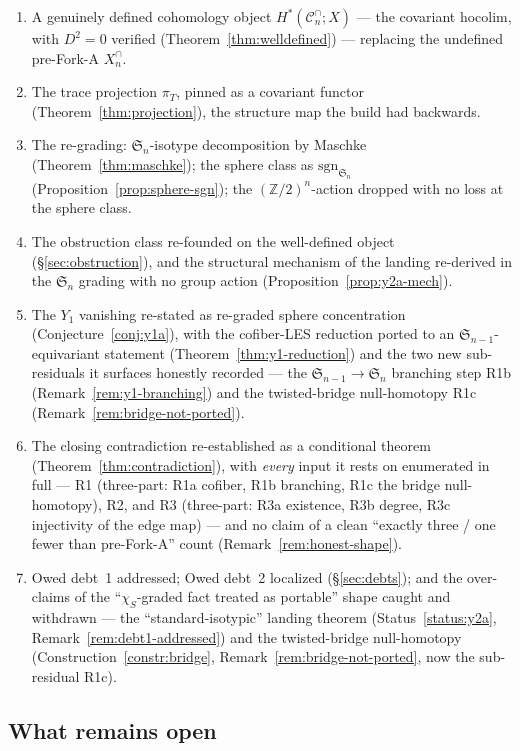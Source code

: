 \documentclass[11pt,oneside]{amsart}
\theoremstyle{plain}
\theoremstyle{definition}
\theoremstyle{remark}
\theoremstyle{honeststyle}
\newcommand{\sgn}{\mathrm{sgn}}
\newcommand{\Sym}{\mathfrak{S}}
\newcommand{\Z}{\mathbb{Z}}
\newcommand{\Cn}{\mathcal{C}^{\cap}_n}
\newcommand{\walsh}[1]{\chi_{#1}}
\begin{document}
\begin{enumerate}[leftmargin=1.9em]
\item A genuinely defined cohomology object $H^{*}(\Cn;X)$ --- the
  covariant hocolim, with $D^2=0$ verified
  (Theorem~\ref{thm:welldefined}) --- replacing the undefined
  pre-Fork-A $X^{\cap}_n$.
\item The trace projection $\pi_T$, pinned as a covariant functor
  (Theorem~\ref{thm:projection}), the structure map the build had
  backwards.
\item The re-grading: $\Sym_n$-isotype decomposition by Maschke
  (Theorem~\ref{thm:maschke}); the sphere class as $\sgn_{\Sym_n}$
  (Proposition~\ref{prop:sphere-sgn}); the $(\Z/2)^n$-action dropped
  with no loss at the sphere class.
\item The obstruction class re-founded on the well-defined object
  (\S\ref{sec:obstruction}), and the structural mechanism of the
  landing re-derived in the $\Sym_n$ grading with no group action
  (Proposition~\ref{prop:y2a-mech}).
\item The $Y_1$ vanishing re-stated as re-graded sphere concentration
  (Conjecture~\ref{conj:y1a}), with the cofiber-LES reduction ported
  to an $\Sym_{n-1}$-equivariant statement
  (Theorem~\ref{thm:y1-reduction}) and the two new sub-residuals it
  surfaces honestly recorded --- the $\Sym_{n-1}\to\Sym_n$ branching
  step R1b (Remark~\ref{rem:y1-branching}) and the twisted-bridge
  null-homotopy R1c (Remark~\ref{rem:bridge-not-ported}).
\item The closing contradiction re-established as a conditional
  theorem (Theorem~\ref{thm:contradiction}), with \emph{every} input
  it rests on enumerated in full --- R1 (three-part: R1a cofiber, R1b
  branching, R1c the bridge null-homotopy), R2, and R3 (three-part:
  R3a existence, R3b degree, R3c injectivity of the edge map) --- and
  no claim of a clean ``exactly three / one fewer than pre-Fork-A''
  count (Remark~\ref{rem:honest-shape}).
\item Owed debt~1 addressed; Owed debt~2 localized
  (\S\ref{sec:debts}); and the over-claims of the
  ``$\walsh{S}$-graded fact treated as portable'' shape caught and
  withdrawn --- the ``standard-isotypic'' landing theorem
  (Status~\ref{status:y2a}, Remark~\ref{rem:debt1-addressed}) and the
  twisted-bridge null-homotopy (Construction~\ref{constr:bridge},
  Remark~\ref{rem:bridge-not-ported}, now the sub-residual R1c).
\end{enumerate}

\subsection{What remains open}
\label{ssec:open}
\end{document}
